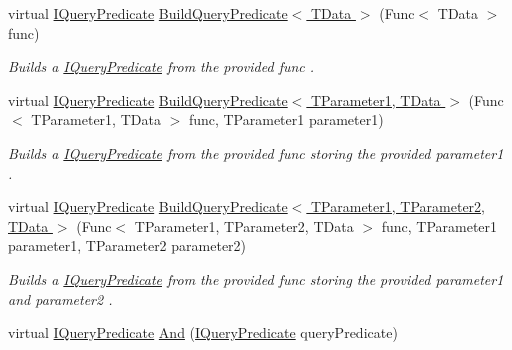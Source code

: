 \begin{DoxyCompactItemize}
\item 
virtual \hyperlink{interfaceCqrs_1_1Repositories_1_1Queries_1_1IQueryPredicate}{I\+Query\+Predicate} \hyperlink{classCqrs_1_1Repositories_1_1Queries_1_1QueryStrategy_ad8d28df2576ea9669e4b02fd368ffab5_ad8d28df2576ea9669e4b02fd368ffab5}{Build\+Query\+Predicate$<$ T\+Data $>$} (Func$<$ T\+Data $>$ func)
\begin{DoxyCompactList}\small\item\em Builds a \hyperlink{interfaceCqrs_1_1Repositories_1_1Queries_1_1IQueryPredicate}{I\+Query\+Predicate} from the provided {\itshape func} . \end{DoxyCompactList}\item 
virtual \hyperlink{interfaceCqrs_1_1Repositories_1_1Queries_1_1IQueryPredicate}{I\+Query\+Predicate} \hyperlink{classCqrs_1_1Repositories_1_1Queries_1_1QueryStrategy_a00435830d1204507b1bf515263607be0_a00435830d1204507b1bf515263607be0}{Build\+Query\+Predicate$<$ T\+Parameter1, T\+Data $>$} (Func$<$ T\+Parameter1, T\+Data $>$ func, T\+Parameter1 parameter1)
\begin{DoxyCompactList}\small\item\em Builds a \hyperlink{interfaceCqrs_1_1Repositories_1_1Queries_1_1IQueryPredicate}{I\+Query\+Predicate} from the provided {\itshape func}  storing the provided {\itshape parameter1} . \end{DoxyCompactList}\item 
virtual \hyperlink{interfaceCqrs_1_1Repositories_1_1Queries_1_1IQueryPredicate}{I\+Query\+Predicate} \hyperlink{classCqrs_1_1Repositories_1_1Queries_1_1QueryStrategy_af8d1066419789fe942ebc167cd76ddfb_af8d1066419789fe942ebc167cd76ddfb}{Build\+Query\+Predicate$<$ T\+Parameter1, T\+Parameter2, T\+Data $>$} (Func$<$ T\+Parameter1, T\+Parameter2, T\+Data $>$ func, T\+Parameter1 parameter1, T\+Parameter2 parameter2)
\begin{DoxyCompactList}\small\item\em Builds a \hyperlink{interfaceCqrs_1_1Repositories_1_1Queries_1_1IQueryPredicate}{I\+Query\+Predicate} from the provided {\itshape func}  storing the provided {\itshape parameter1}  and {\itshape parameter2} . \end{DoxyCompactList}\item 
virtual \hyperlink{interfaceCqrs_1_1Repositories_1_1Queries_1_1IQueryPredicate}{I\+Query\+Predicate} \hyperlink{classCqrs_1_1Repositories_1_1Queries_1_1QueryStrategy_a860b209d9e99d7de5302ef4e19d318f0_a860b209d9e99d7de5302ef4e19d318f0}{And} (\hyperlink{interfaceCqrs_1_1Repositories_1_1Queries_1_1IQueryPredicate}{I\+Query\+Predicate} query\+Predicate)

\end{DoxyCompactItemize}
